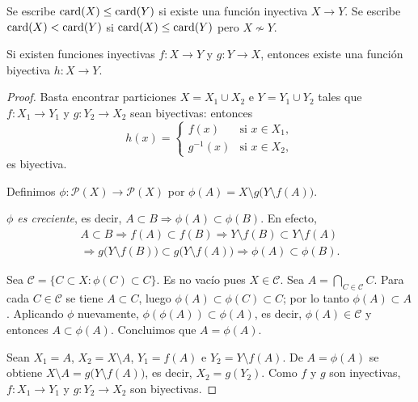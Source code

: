 \begin{definition}
  Se escribe \(\operatorname{card}(X) \leq \operatorname{card}(Y)\) si existe una función inyectiva \(X \to Y\). Se escribe \(\operatorname{card}(X) < \operatorname{card}(Y)\) si \(\operatorname{card}(X) \leq \operatorname{card}(Y)\) pero \(X \not\sim Y\).
\end{definition}

\begin{theorem}
  Si existen funciones inyectivas \(f\colon X \to Y\) y \(g\colon Y \to X\), entonces existe una función biyectiva \(h\colon X \to Y\).
\end{theorem}

\begin{proof}
  Basta encontrar particiones \(X = X_1 \cup X_2\) e \(Y = Y_1 \cup Y_2\) tales que \(f\colon X_1 \to Y_1\) y \(g\colon Y_2 \to X_2\) sean biyectivas: entonces
  \[
    h(x) =
    \begin{cases}
      f(x)      & \text{si } x \in X_1, \\
      g^{-1}(x) & \text{si } x \in X_2,
    \end{cases}
  \]
  es biyectiva.

  Definimos \(\phi\colon \mathcal{P}(X) \to \mathcal{P}(X)\) por \(\phi(A) = X \setminus g\bigl(Y \setminus f(A)\bigr)\).

  \emph{\(\phi\) es creciente}, es decir, \(A \subset B \Rightarrow \phi(A) \subset \phi(B)\). En efecto,
  \begin{multline*}
    A \subset B \Rightarrow f(A) \subset f(B) \Rightarrow Y \setminus f(B) \subset Y \setminus f(A) \\
    \Rightarrow g\bigl(Y \setminus f(B)\bigr) \subset g\bigl(Y \setminus f(A)\bigr) \Rightarrow \phi(A) \subset \phi(B).
  \end{multline*}

  Sea \(\mathscr{C} = \{ C \subset X : \phi(C) \subset C \}\). Es no vacío pues \(X \in \mathscr{C}\). Sea \(A = \bigcap_{C \in \mathscr{C}} C\). Para cada \(C \in \mathscr{C}\) se tiene \(A \subset C\), luego \(\phi(A) \subset \phi(C) \subset C\); por lo tanto \(\phi(A) \subset A\). Aplicando \(\phi\) nuevamente, \(\phi(\phi(A)) \subset \phi(A)\), es decir, \(\phi(A) \in \mathscr{C}\) y entonces \(A \subset \phi(A)\). Concluimos que \(A = \phi(A)\).

  Sean \(X_1 = A\), \(X_2 = X \setminus A\), \(Y_1 = f(A)\) e \(Y_2 = Y \setminus f(A)\). De \(A = \phi(A)\) se obtiene \(X \setminus A = g\bigl(Y \setminus f(A)\bigr)\), es decir, \(X_2 = g(Y_2)\). Como \(f\) y \(g\) son inyectivas, \(f\colon X_1 \to Y_1\) y \(g\colon Y_2 \to X_2\) son biyectivas.
\end{proof}

